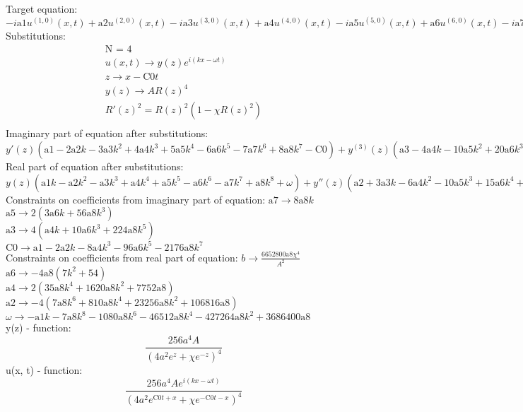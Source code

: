 \documentclass[12pt,a4paper,draft]{article}
\begin{document}
Target equation:
\\$
-i \text{a1} u^{(1,0)}(x,t)+\text{a2} u^{(2,0)}(x,t)-i \text{a3} u^{(3,0)}(x,t)+\text{a4} u^{(4,0)}(x,t)-i \text{a5} u^{(5,0)}(x,t)+\text{a6} u^{(6,0)}(x,t)-i \text{a7} u^{(7,0)}(x,t)+\text{a8} u^{(8,0)}(x,t)-b u(x,t) \left| u(x,t)\right| ^2+i u^{(0,1)}(x,t)=0
$\\
Substitutions:
$$
\begin{array}{c}
 \text{N = 4} \\
 u(x,t)\to y(z) e^{i (k x-\omega  t)} \\
 z\to x-\text{C0} t \\
 y(z)\to A R(z)^4 \\
 R'(z)^2=R(z)^2 \left(1-\chi  R(z)^2\right) \\
\end{array}
$$
Imaginary part of equation after substitutions:
\\$
y'(z) \left(\text{a1}-2 \text{a2} k-3 \text{a3} k^2+4 \text{a4} k^3+5 \text{a5} k^4-6 \text{a6} k^5-7 \text{a7} k^6+8 \text{a8} k^7-\text{C0}\right)+y^{(3)}(z) \left(\text{a3}-4 \text{a4} k-10 \text{a5} k^2+20 \text{a6} k^3+35 \text{a7} k^4-56 \text{a8} k^5\right)+\text{a5} y^{(5)}(z)-6 \text{a6} k y^{(5)}(z)-21 \text{a7} k^2 y^{(5)}(z)+\text{a7} y^{(7)}(z)+56 \text{a8} k^3 y^{(5)}(z)-8 \text{a8} k y^{(7)}(z)=0
$\\
Real part of equation after substitutions:
\\$
y(z) \left(\text{a1} k-\text{a2} k^2-\text{a3} k^3+\text{a4} k^4+\text{a5} k^5-\text{a6} k^6-\text{a7} k^7+\text{a8} k^8+\omega \right)+y''(z) \left(\text{a2}+3 \text{a3} k-6 \text{a4} k^2-10 \text{a5} k^3+15 \text{a6} k^4+21 \text{a7} k^5-28 \text{a8} k^6\right)+\text{a4} y^{(4)}(z)+5 \text{a5} k y^{(4)}(z)-15 \text{a6} k^2 y^{(4)}(z)+\text{a6} y^{(6)}(z)-35 \text{a7} k^3 y^{(4)}(z)+7 \text{a7} k y^{(6)}(z)+70 \text{a8} k^4 y^{(4)}(z)-28 \text{a8} k^2 y^{(6)}(z)+\text{a8} y^{(8)}(z)-b y(z)^3=0
$\\
Constraints on coefficients from imaginary part of equation:
$\text{a7}\to 8 \text{a8} k$\\
$\text{a5}\to 2 \left(3 \text{a6} k+56 \text{a8} k^3\right)$\\
$\text{a3}\to 4 \left(\text{a4} k+10 \text{a6} k^3+224 \text{a8} k^5\right)$\\
$\text{C0}\to \text{a1}-2 \text{a2} k-8 \text{a4} k^3-96 \text{a6} k^5-2176 \text{a8} k^7$\\
Constraints on coefficients from real part of equation:
$b\to \frac{6652800 \text{a8} \chi ^4}{A^2}$\\
$\text{a6}\to -4 \text{a8} \left(7 k^2+54\right)$\\
$\text{a4}\to 2 \left(35 \text{a8} k^4+1620 \text{a8} k^2+7752 \text{a8}\right)$\\
$\text{a2}\to -4 \left(7 \text{a8} k^6+810 \text{a8} k^4+23256 \text{a8} k^2+106816 \text{a8}\right)$\\
$\omega \to -\text{a1} k-7 \text{a8} k^8-1080 \text{a8} k^6-46512 \text{a8} k^4-427264 \text{a8} k^2+3686400 \text{a8}$\\


y(z) - function:
$$
\frac{256 a^4 A}{\left(4 a^2 e^z+\chi  e^{-z}\right)^4}
$$
u(x, t) - function:
$$
\frac{256 a^4 A e^{i (k x-\omega  t)}}{\left(4 a^2 e^{\text{C0} t+x}+\chi  e^{-\text{C0} t-x}\right)^4}
$$
\end{document}
